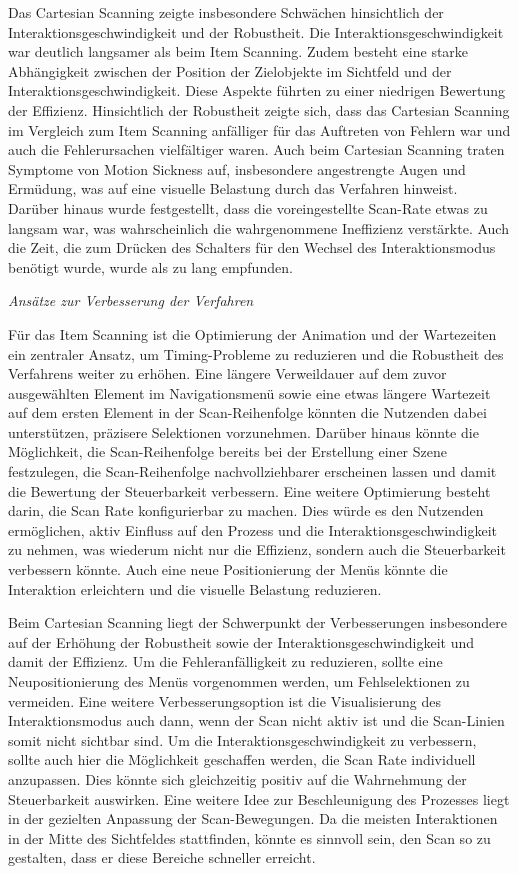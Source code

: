 Das Cartesian Scanning zeigte insbesondere Schwächen hinsichtlich der Interaktionsgeschwindigkeit und der Robustheit. Die Interaktionsgeschwindigkeit war deutlich langsamer als beim Item Scanning. Zudem besteht eine starke Abhängigkeit zwischen der Position der Zielobjekte im Sichtfeld und der Interaktionsgeschwindigkeit. Diese Aspekte führten zu einer niedrigen Bewertung der Effizienz. Hinsichtlich der Robustheit zeigte sich, dass das Cartesian Scanning im Vergleich zum Item Scanning anfälliger für das Auftreten von Fehlern war und auch die Fehlerursachen vielfältiger waren. 
Auch beim Cartesian Scanning traten Symptome von Motion Sickness auf, insbesondere angestrengte Augen und Ermüdung, was auf eine visuelle Belastung durch das Verfahren hinweist.
Darüber hinaus wurde festgestellt, dass die voreingestellte Scan-Rate etwas zu langsam war, was wahrscheinlich die wahrgenommene Ineffizienz verstärkte. Auch die Zeit, die zum Drücken des Schalters für den Wechsel des Interaktionsmodus benötigt wurde, wurde als zu lang empfunden.

\textit{Ansätze zur Verbesserung der Verfahren}

Für das Item Scanning ist die Optimierung der Animation und der Wartezeiten ein zentraler Ansatz, um Timing-Probleme zu reduzieren und die Robustheit des Verfahrens weiter zu erhöhen. Eine längere Verweildauer auf dem zuvor ausgewählten Element im Navigationsmenü sowie eine etwas längere Wartezeit auf dem ersten Element in der Scan-Reihenfolge könnten die Nutzenden dabei unterstützen, präzisere Selektionen vorzunehmen. Darüber hinaus könnte die Möglichkeit, die Scan-Reihenfolge bereits bei der Erstellung einer Szene festzulegen, die Scan-Reihenfolge nachvollziehbarer erscheinen lassen und damit die Bewertung der Steuerbarkeit verbessern.
Eine weitere Optimierung besteht darin, die Scan Rate konfigurierbar zu machen. Dies würde es den Nutzenden ermöglichen, aktiv Einfluss auf den Prozess und die Interaktionsgeschwindigkeit zu nehmen, was wiederum nicht nur die Effizienz, sondern auch die Steuerbarkeit verbessern könnte. Auch eine neue Positionierung der Menüs könnte die Interaktion erleichtern und die visuelle Belastung reduzieren.

Beim Cartesian Scanning liegt der Schwerpunkt der Verbesserungen insbesondere auf der Erhöhung der Robustheit sowie der Interaktionsgeschwindigkeit und damit der Effizienz. Um die Fehleranfälligkeit zu reduzieren, sollte eine Neupositionierung des Menüs vorgenommen werden, um Fehlselektionen zu vermeiden. Eine weitere Verbesserungsoption ist die Visualisierung des Interaktionsmodus auch dann, wenn der Scan nicht aktiv ist und die Scan-Linien somit nicht sichtbar sind. 
Um die Interaktionsgeschwindigkeit zu verbessern, sollte auch hier die Möglichkeit geschaffen werden, die Scan Rate individuell anzupassen. Dies könnte sich gleichzeitig positiv auf die Wahrnehmung der Steuerbarkeit auswirken. Eine weitere Idee zur Beschleunigung des Prozesses liegt in der gezielten Anpassung der Scan-Bewegungen. Da die meisten Interaktionen in der Mitte des Sichtfeldes stattfinden, könnte es sinnvoll sein, den Scan so zu gestalten, dass er diese Bereiche schneller erreicht. 

